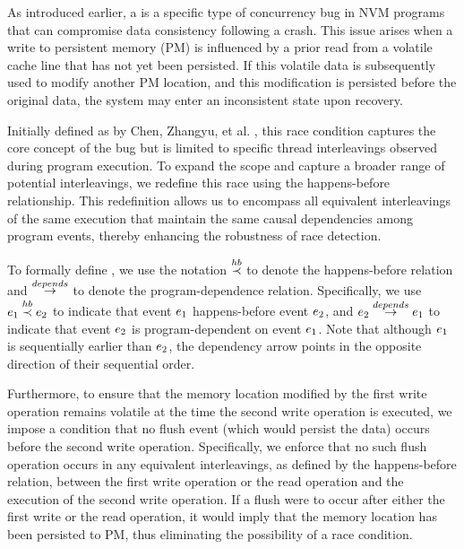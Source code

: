 \documentclass[nonacm,sigplan]{acmart}
\begin{document}
As introduced earlier, a \NameRace is a specific type of concurrency bug in NVM programs that can compromise data consistency following a crash. This issue arises when a write to persistent memory (PM) is influenced by a prior read from a volatile cache line that has not yet been persisted. If this volatile data is subsequently used to modify another PM location, and this modification is persisted before the original data, the system may enter an inconsistent state upon recovery.

Initially defined as \NamePMRaceRace by Chen, Zhangyu, et al. \cite{pmrace2022}, this race condition captures the core concept of the bug but is limited to specific thread interleavings observed during program execution. To expand the scope and capture a broader range of potential interleavings, we redefine this race using the happens-before relationship. This redefinition allows us to encompass all equivalent interleavings of the same execution that maintain the same causal dependencies among program events, thereby enhancing the robustness of race detection.

To formally define \NameRace, we use the notation $\overset{hb}{\prec}$ to denote the happens-before relation and $\overset{depends}{\to}$ to denote the program-dependence relation. Specifically, we use ${e_1} \overset{hb}{\prec} {e_2}$ to indicate that event $e_1$ happens-before event $e_2$, and ${e_2} \overset{depends}{\to} {e_1}$ to indicate that event $e_2$ is program-dependent on event $e_1$.
Note that although $e_1$ is sequentially earlier than $e_2$, the dependency arrow points in the opposite direction of their sequential order.


Furthermore, to ensure that the memory location modified by the first write operation remains volatile at the time the second write operation is executed, we impose a condition that no flush event (which would persist the data) occurs before the second write operation. Specifically, we enforce that no such flush operation occurs in any equivalent interleavings, as defined by the happens-before relation, between the first write operation or the read operation and the execution of the second write operation. If a flush were to occur after either the first write or the read operation, it would imply that the memory location has been persisted to PM, thus eliminating the possibility of a race condition.
\end{document}
